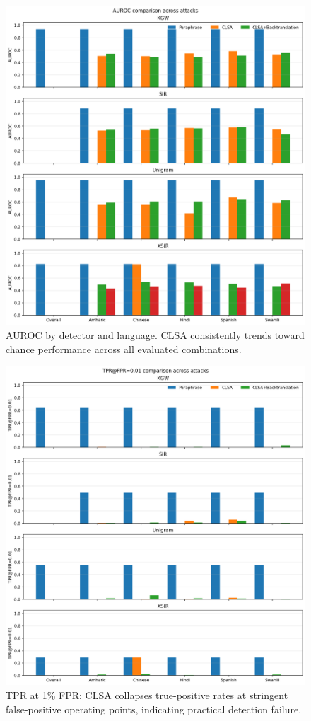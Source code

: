 \documentclass{article}
\begin{document}
\begin{figure}[h]
\centering
\includegraphics[width=\linewidth]{auroc_bars.png}
\caption{AUROC by detector and language. CLSA consistently trends toward chance performance across all evaluated combinations.}
\end{figure}

\begin{figure}[h]
\centering
\includegraphics[width=\linewidth]{tpr_fpr_0_01_bars.png}
\caption{TPR at 1\% FPR: CLSA collapses true-positive rates at stringent false-positive operating points, indicating practical detection failure.}
\end{figure}
\end{document}
